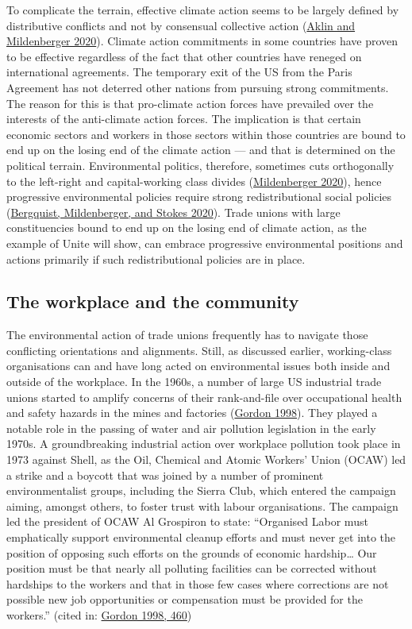 \documentclass[a4paper, nobind]{templates/ociamthesis}
\begin{document}
To complicate the terrain, effective climate action seems to be largely defined by distributive conflicts and not by consensual collective action (\protect\hyperlink{ref-aklin_prisoners_2020}{Aklin and Mildenberger 2020}). Climate action commitments in some countries have proven to be effective regardless of the fact that other countries have reneged on international agreements. The temporary exit of the US from the Paris Agreement has not deterred other nations from pursuing strong commitments. The reason for this is that pro-climate action forces have prevailed over the interests of the anti-climate action forces. The implication is that certain economic sectors and workers in those sectors within those countries are bound to end up on the losing end of the climate action --- and that is determined on the political terrain. Environmental politics, therefore, sometimes cuts orthogonally to the left-right and capital-working class divides (\protect\hyperlink{ref-mildenberger_carbon_2020}{Mildenberger 2020}), hence progressive environmental policies require strong redistributional social policies (\protect\hyperlink{ref-bergquist_combining_2020}{Bergquist, Mildenberger, and Stokes 2020}). Trade unions with large constituencies bound to end up on the losing end of climate action, as the example of Unite will show, can embrace progressive environmental positions and actions primarily if such redistributional policies are in place.

\hypertarget{the-workplace-and-the-community}{%
\subsection{The workplace and the community}\label{the-workplace-and-the-community}}

The environmental action of trade unions frequently has to navigate those conflicting orientations and alignments. Still, as discussed earlier, working-class organisations can and have long acted on environmental issues both inside and outside of the workplace. In the 1960s, a number of large US industrial trade unions started to amplify concerns of their rank-and-file over occupational health and safety hazards in the mines and factories (\protect\hyperlink{ref-gordon_shell_1998}{Gordon 1998}). They played a notable role in the passing of water and air pollution legislation in the early 1970s. A groundbreaking industrial action over workplace pollution took place in 1973 against Shell, as the Oil, Chemical and Atomic Workers' Union (OCAW) led a strike and a boycott that was joined by a number of prominent environmentalist groups, including the Sierra Club, which entered the campaign aiming, amongst others, to foster trust with labour organisations. The campaign led the president of OCAW Al Grospiron to state: ``Organised Labor must emphatically support environmental cleanup efforts and must never get into the position of opposing such efforts on the grounds of economic hardship\ldots{} Our position must be that nearly all polluting facilities can be corrected without hardships to the workers and that in those few cases where corrections are not possible new job opportunities or compensation must be provided for the workers.'' (cited in: \protect\hyperlink{ref-gordon_shell_1998}{Gordon 1998, 460})
\end{document}
